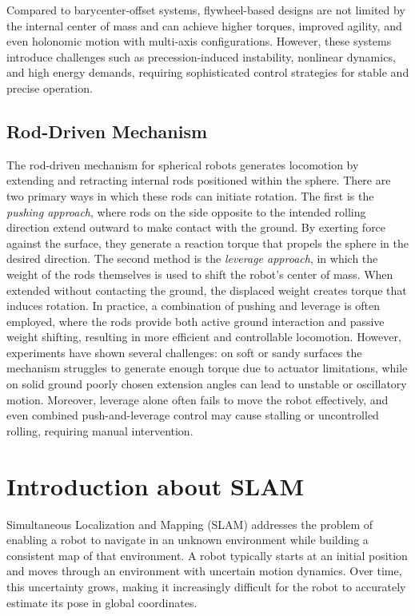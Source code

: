 \documentclass[english, bachelor, utf8]{base/thesis_telematics}
\begin{document}
Compared to barycenter-offset systems, flywheel-based designs are not limited by the internal center of mass and can achieve higher torques, improved agility, and even holonomic motion with multi-axis configurations.
However, these systems introduce challenges such as precession-induced instability, nonlinear dynamics, and high energy demands, requiring sophisticated control strategies for stable and precise operation.\cite{flywheel_hamaster_explanation}

\subsection{Rod-Driven Mechanism}
The rod-driven mechanism for spherical robots generates locomotion by extending and retracting internal rods positioned within the sphere. 
There are two primary ways in which these rods can initiate rotation. 
The first is the \textit{pushing approach}, where rods on the side opposite to the intended rolling direction extend outward to make contact with the ground. 
By exerting force against the surface, they generate a reaction torque that propels the sphere in the desired direction. 
The second method is the \textit{leverage approach}, in which the weight of the rods themselves is used to shift the robot’s center of mass. 
When extended without contacting the ground, the displaced weight creates torque that induces rotation. 
In practice, a combination of pushing and leverage is often employed, where the rods provide both active ground interaction and passive weight shifting, resulting in more efficient and controllable locomotion. 
However, experiments have shown several challenges: on soft or sandy surfaces the mechanism struggles to generate enough torque due to actuator limitations, while on solid ground poorly chosen extension angles can lead to unstable or oscillatory motion. 
Moreover, leverage alone often fails to move the robot effectively, and even combined push-and-leverage control may cause stalling or uncontrolled rolling, requiring manual intervention. \cite{rod_sphere}



\section{Introduction about SLAM}
Simultaneous Localization and Mapping (SLAM) addresses the problem of enabling a robot to navigate in an unknown environment while building a consistent map of that environment.
A robot typically starts at an initial position and moves through an environment with uncertain motion dynamics. 
Over time, this uncertainty grows, making it increasingly difficult for the robot to accurately estimate its pose in global coordinates. 
\end{document}
